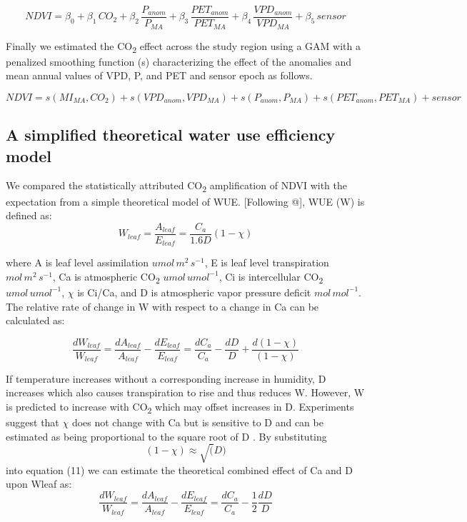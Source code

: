 \documentclass[gc, manuscript]{copernicus}
\begin{document}
\begin{equation}
NDVI=\beta_0+ \beta_1\,CO_2+\beta_2\,\frac{P_{anom}}{P_{MA}}+\beta_3\,\frac{PET_{anom}}{PET_{MA}}+\beta_4\,\frac{VPD_{anom}}{{VPD_{MA}}}+\beta_5\,sensor
\end{equation}

Finally we estimated the CO\textsubscript{2} effect across the study
region using a GAM with a penalized smoothing function (s)
characterizing the effect of the anomalies and mean annual values of
VPD, P, and PET and sensor epoch as follows.

\begin{equation}
NDVI = s(MI_{MA},CO_2) + s(VPD_{anom},VPD_{MA})+s(P_{anom},P_{MA})+s(PET_{anom},PET_{MA})+sensor
\end{equation}

\subsection{A simplified theoretical water use efficiency model}

We compared the statistically attributed CO\textsubscript{2}
amplification of NDVI with the expectation from a simple theoretical
model of WUE. {[}Following @\cite{donohueImpactCOFertilization2013b}{]},
WUE (W) is defined as: \begin{equation}
W_{leaf} = \frac{A_{leaf}}{E_{leaf}} = \frac{C_a}{1.6D}(1 - \chi)
\end{equation}

where A is leaf level assimilation \(umol\,m^{2}\,s^{-1}\), E is leaf
level transpiration \(mol\,m^{2}\,s^{-1}\), Ca is atmospheric
CO\textsubscript{2} \(umol\,umol^{-1}\), Ci is intercellular
CO\textsubscript{2} \(umol\,umol^{-1}\), \(\chi\) is Ci/Ca, and D is
atmospheric vapor pressure deficit \(mol\,mol^{-1}\). The relative rate
of change in W with respect to a change in Ca can be calculated as:

\begin{equation}
\frac{dW_{leaf}}{W_{leaf}}=\frac{dA_{leaf}}{A_{leaf}} - \frac{dE_{leaf}}{E_{leaf}} = \frac{dC_a}{C_a} - \frac{dD}{D} + \frac{d(1-\chi)}{(1-\chi)}
\end{equation}

If temperature increases without a corresponding increase in humidity, D
increases which also causes transpiration to rise and thus reduces W.
However, W is predicted to increase with CO\textsubscript{2} which may
offset increases in D. Experiments suggest that \(\chi\) does not change
with Ca but is sensitive to D \citep{wong_etal85, drake_etal97} and can
be estimated as being proportional to the square root of D
\citep{medlynReconcilingOptimalEmpirical2011d}. By substituting
\[(1-\chi) \approx \sqrt(D)\] into equation (11) we can estimate the
theoretical combined effect of Ca and D upon Wleaf as: \begin{equation}
\frac{dW_{leaf}}{W_{leaf}}=\frac{dA_{leaf}}{A_{leaf}} - \frac{dE_{leaf}}{E_{leaf}} = \frac{dC_a}{C_a} - \frac{1}{2}\frac{dD}{D}
\end{equation}
\end{document}
